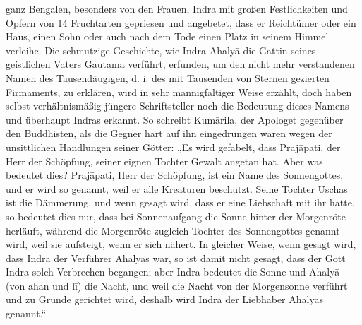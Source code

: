 \documentclass{article}
\begin{document}
ganz Bengalen, besonders von den Frauen, Indra mit großen Festlichkeiten und Opfern von 14 Fruchtarten gepriesen und angebetet, dass er Reichtümer oder ein Haus, einen Sohn oder auch nach dem Tode einen Platz in seinem Himmel verleihe. Die schmutzige Geschichte, wie Indra Ahaly\={a} die Gattin seines geistlichen Vaters Gautama verführt, erfunden, um den nicht mehr verstandenen Namen des Tausendäugigen, d. i. des mit Tausenden von Sternen gezierten Firmaments, zu erklären, wird in sehr mannigfaltiger Weise erzählt, doch haben selbst verhältnismäßig jüngere Schriftsteller noch die Bedeutung dieses Namens und überhaupt Indras erkannt. So schreibt Kum\={a}rila, der Apologet gegenüber den Buddhisten, als die Gegner hart auf ihn eingedrungen waren wegen der unsittlichen Handlungen seiner Götter: „Es wird gefabelt, dass Praj\={a}pati, der Herr der Schöpfung, seiner eignen Tochter Gewalt angetan hat. Aber was bedeutet dies? Praj\={a}pati, Herr der Schöpfung, ist ein Name des Sonnengottes, und er wird so genannt, weil er alle Kreaturen beschützt. Seine Tochter Uschas ist die Dämmerung, und wenn gesagt wird, dass er eine Liebschaft mit ihr hatte, so bedeutet dies nur, dass bei Sonnenaufgang die Sonne hinter der Morgenröte herläuft, während die Morgenröte zugleich Tochter des Sonnengottes genannt wird, weil sie aufsteigt, wenn er sich nähert. In gleicher Weise, wenn gesagt wird, dass Indra der Verführer Ahaly\={a}s war, so ist damit nicht gesagt, dass der Gott Indra solch Verbrechen begangen; aber Indra bedeutet die Sonne und Ahaly\={a} (von ahan und l\={i}) die Nacht, und weil die Nacht von der Morgensonne verführt und zu Grunde gerichtet wird, deshalb wird Indra der Liebhaber Ahaly\={a}s genannt.“
\end{document}
